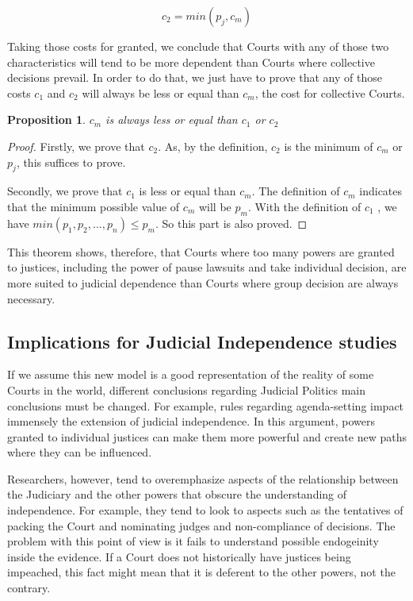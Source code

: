 \documentclass[12pt, a4paper]{article}
\newtheorem{prop}{Proposition}
\begin{document}
\begin{equation} 
	c_2 = min(p_j, c_m)
\end{equation}


Taking those costs for granted, we conclude that Courts 
with any of those two characteristics will tend to be 
more dependent than Courts where collective decisions 
prevail. In order to do that, we just have to prove that
any of those costs $c_1$ and $c_2$ will always be less or equal
than $c_m$, the cost for collective Courts.

\begin{prop}
 $c_m$ is always less or equal than $c_1$ or $c_2$
\end{prop}

\begin{proof}

	Firstly, we prove that $c_2$. As, by the definition,
	$c_2$ is the minimum of $c_m$ or $p_j$, this suffices
	to prove.

	Secondly, we prove that $c_1$ is less or equal
	than $c_m$. The definition of $c_m$ indicates that
	the minimum possible value of $c_m$ will be $p_m$.
	With the definition of $c_1$ , we have
	$min(p_1, p_2, ..., p_n) \leq p_m$. So this part is also proved.

\end{proof}

This theorem shows, therefore, that Courts where too many
powers are granted to justices, including the power of pause
lawsuits and take individual decision, are more suited to
judicial dependence than Courts where group decision are
always necessary.%


\subsection{Implications for Judicial Independence studies}

If we assume this new model is a good representation
of the reality of some Courts in the world,
 different conclusions regarding Judicial
Politics main conclusions must be changed. For example,
rules regarding agenda-setting impact immensely the
extension of judicial independence.
In this argument, powers granted to individual 
justices can make them
more powerful and create new paths where they can be influenced.

Researchers, however, tend to overemphasize aspects 
of the relationship between the Judiciary and 
the other powers that obscure the understanding
of independence. For example, they tend to look to 
aspects such as the tentatives of packing 
the Court and nominating judges and non-compliance of
decisions. The problem with this point of view is 
it fails to understand possible endogeinity inside the
evidence. If a Court does not historically have justices
being impeached, this fact might mean that it is deferent to 
the other powers, not the contrary.%
\end{document}
